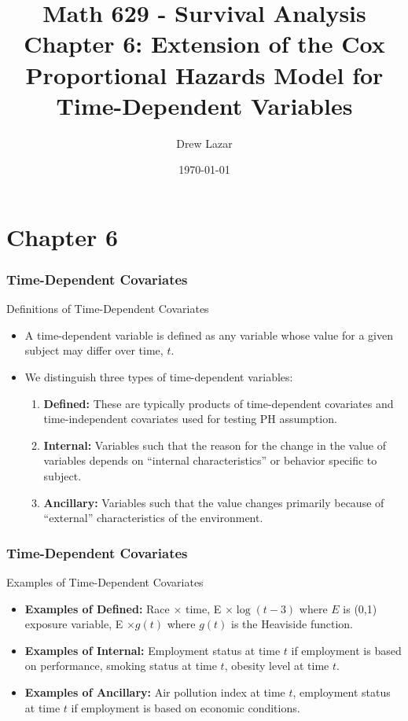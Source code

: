 \documentclass{beamer}
\title{Math 629 - Survival Analysis \\ Chapter 6: Extension
of the Cox Proportional Hazards Model for Time-Dependent Variables
}
\author{Drew Lazar}
\institute{Ball State University}
\date{\today}
\theoremstyle{definition}
\begin{document}
\begin{frame}
    \titlepage
\end{frame}



\section{Chapter 6}
\begin{frame}
\frametitle{Time-Dependent Covariates}
\begin{block}{Definitions of Time-Dependent Covariates}
\begin{itemize}
\item A time-dependent variable is defined as any variable whose value for a given subject may differ over time, $t$.
\item We distinguish three types of time-dependent variables:
\begin{enumerate}
\item \textbf{Defined:} These are typically products of time-dependent covariates and time-independent covariates used for testing PH assumption.
\item \textbf{Internal:} Variables such that the reason for the change in the value of variables depends on ``internal characteristics'' or behavior specific to subject.
\item \textbf{Ancillary:} Variables such that the value changes primarily because of ``external'' characteristics of the environment.
\end{enumerate}
\end{itemize}
\end{block}
\end{frame}

\begin{frame}
\frametitle{Time-Dependent Covariates}
\begin{block}{Examples of Time-Dependent Covariates}
\begin{itemize}
\item \textbf{Examples of Defined:} Race $\times$ time, E $\times \log(t-3)$ where $E$ is (0,1) exposure variable, E $\times g(t)$ where $g(t)$ is the Heaviside function.
\item \textbf{Examples of Internal:} Employment status at time $t$ if employment is based on performance, smoking status at time $t$, obesity level at time $t$.
\item \textbf{Examples of Ancillary:} Air pollution index at time $t$, employment status at time $t$ if employment is based on economic conditions.
\end{itemize}
\end{block}
\end{frame}
\end{document}
